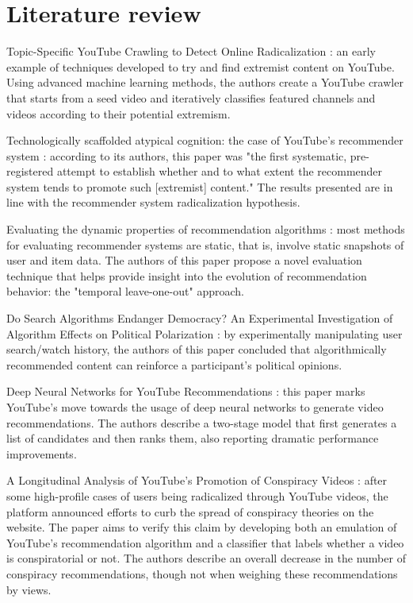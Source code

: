 
\chapter{Literature review}

Topic-Specific YouTube Crawling to Detect Online Radicalization
\citet{agarwal_topic-specific_2015}: an early example of techniques developed to
try and find extremist content on YouTube. Using advanced machine learning
methods, the authors create a YouTube crawler that starts from a seed video and
iteratively classifies featured channels and videos according to their potential
extremism.

Technologically scaffolded atypical cognition: the case of YouTube's recommender
system \citet{alfano_technologically_2020}: according to its authors, this paper
was "the first systematic, pre-registered attempt to establish whether and to
what extent the recommender system tends to promote such [extremist] content."
The results presented are in line with the recommender system radicalization
hypothesis.

Evaluating the dynamic properties of recommendation algorithms
\citet{burke_evaluating_2010}: most methods for evaluating recommender systems
are static, that is, involve static snapshots of user and item data. The authors
of this paper propose a novel evaluation technique that helps provide insight
into the evolution of recommendation behavior: the "temporal leave-one-out"
approach.

Do Search Algorithms Endanger Democracy? An Experimental Investigation of
Algorithm Effects on Political Polarization \citet{cho_search_2020}: by
experimentally manipulating user search/watch history, the authors of this paper
concluded that algorithmically recommended content can reinforce a participant's
political opinions.

Deep Neural Networks for YouTube Recommendations \citet{covington_deep_2016}:
this paper marks YouTube's move towards the usage of deep neural networks to
generate video recommendations. The authors describe a two-stage model that
first generates a list of candidates and then ranks them, also reporting
dramatic performance improvements.

A Longitudinal Analysis of YouTube's Promotion of Conspiracy Videos
\citet{faddoul_longitudinal_2020}: after some high-profile cases of users being
radicalized through YouTube videos, the platform announced efforts to curb the
spread of conspiracy theories on the website. The paper aims to verify this
claim by developing both an emulation of YouTube's recommendation algorithm and
a classifier that labels whether a video is conspiratorial or not. The authors
describe an overall decrease in the number of conspiracy recommendations, though
not when weighing these recommendations by views.

